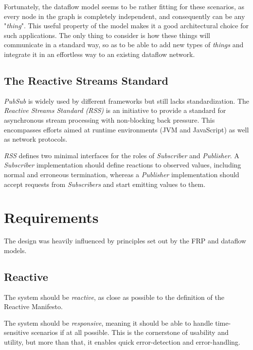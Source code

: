 \documentclass[sigplan,review,anonymous]{acmart}
\begin{document}
Fortunately, the dataflow model seems to be rather fitting for these
scenarios\cite{iot_dataflow}, as every node in the graph is completely
independent, and consequently can be any "\textit{thing}". This useful property
of the model makes it a good architectural choice for such applications. The
only thing to consider is how these things will communicate in a standard way,
so as to be able to add new types of \textit{things} and integrate it in an
effortless way to an existing dataflow network.

\subsection{The Reactive Streams Standard}

\textit{PubSub} is widely used by different frameworks but still lacks
standardization. The \textit{Reactive Streams Standard (RSS)} is an initiative
to provide a standard for asynchronous stream processing with non-blocking back
pressure. This encompasses efforts aimed at runtime environments (JVM and
JavaScript) as well as network protocols\cite{rss}.

\textit{RSS} defines two minimal interfaces for the roles of \textit{Subscriber}
and \textit{Publisher}.
A \textit{Subscriber} implementation should define
reactions to observed values, including normal and erroneous termination,
whereas a \textit{Publisher} implementation should accept requests from
\textit{Subscribers} and start emitting values to them.

\section{Requirements} \label{sec:requirements}

The design was heavily influenced by principles set out by the FRP and dataflow
models.

\subsection{Reactive}

The system should be \textit{reactive}, as close as possible to the definition
of the Reactive Manifesto\cite{manifesto}.

The system should be \textit{responsive}, meaning it should be able to handle
time-sensitive scenarios if at all possible. This is the cornerstone of
usability and utility, but more than that, it enables quick error-detection and
error-handling.
\end{document}
